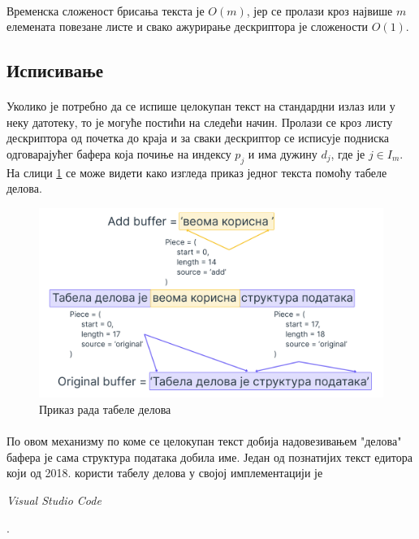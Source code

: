 \documentclass[12pt,oneside]{memoir}
\begin{document}
\paragraph{}
Временска сложеност брисања текста је \(O(m)\), јер се пролази кроз највише \(m\)
елемената повезане листе и свако ажурирање дескриптора је сложености \(O(1)\).

\subsection{Исписивање}
\paragraph{}
Уколико је потребно да се испише целокупан текст на стандардни излаз или у неку датотеку,
то је могуће постићи на следећи начин. Пролази се кроз листу дескриптора од почетка до краја
и за сваки дескриптор се исписује подниска одговарајућег бафера која почиње на индексу 
\(p_j\) и има дужину \(d_j\), где је \(j \in I_m\). На слици \ref{fig:piece_table} се може
видети како изгледа приказ једног текста помоћу табеле делова.

\begin{figure}[!ht]
	\centering
	\includegraphics[width=1.0\textwidth]{images/piece_table_1.png}
	\caption{Приказ рада табеле делова}
	\label{fig:piece_table}
\end{figure}

\paragraph{}
По овом механизму по коме се целокупан текст добија надовезивањем "делова" бафера
је сама структура података добила име. Један од познатијих текст едитора који од 2018. 
користи табелу делова у својој имплементацији је \begin{latinica}\textit{Visual Studio Code}\end{latinica} \cite{VSC}.
\end{document}
